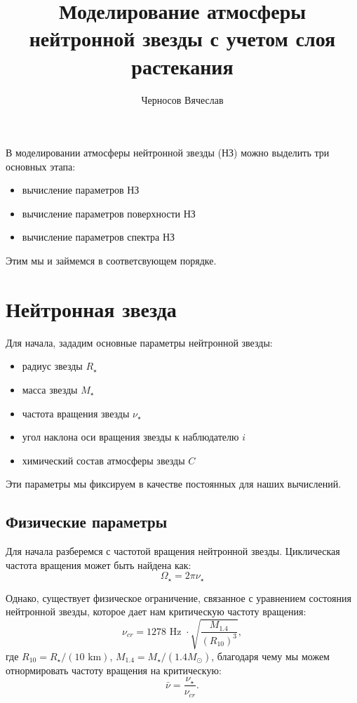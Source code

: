 
\author{Черносов Вячеслав}
\title{Моделирование атмосферы нейтронной звезды с учетом слоя растекания}


\maketitle
В моделировании атмосферы нейтронной звезды (НЗ) можно выделить три основных этапа: 
\begin{itemize}
    \item вычисление параметров НЗ
    \item вычисление параметров поверхности НЗ 
    \item вычисление параметров спектра НЗ
\end{itemize}
Этим мы и займемся в соответсвующем порядке.

\section{Нейтронная звезда}

Для начала, зададим основные параметры нейтронной звезды:
\begin{itemize}
    \item радиус звезды $R_{\star}$ 
    \item масса звезды $M_{\star}$
    \item частота вращения звезды $\nu_{\star}$ 
    \item угол наклона оси вращения звезды к наблюдателю $i$
    \item химический состав атмосферы звезды $C$
\end{itemize}
Эти параметры мы фиксируем в качестве постоянных для наших вычислений.

\subsection{Физические параметры}
Для начала разберемся с частотой вращения нейтронной звезды. Циклическая частота вращения может быть найдена как:
$$\Omega_{\star} = 2 \pi \nu_{\star}$$

Однако, существует физическое ограничение, связанное с уравнением состояния нейтронной звезды, которое дает нам критическую частоту вращения:
$$\nu_{cr} = 1278 \text{ Hz } \cdot \sqrt{\frac{M_{1.4}}{(R_{10})^{3}}},$$
где $R_{10} = R_{\star}/(10\text{ km})$, $M_{1.4} = M_{\star}/(1.4 M_{\odot})$, благодаря чему мы можем отнормировать частоту вращения на критическую:
$$\bar{\nu} = \frac{\nu_{\star}}{\nu_{cr}}.$$

